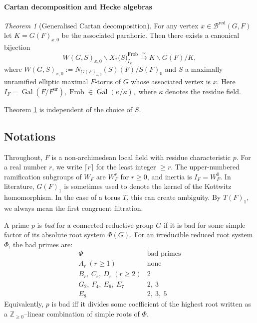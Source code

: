 \documentclass[american]{article}
\numberwithin{equation}{section}
\numberwithin{figure}{section}
\theoremstyle{plain}
\theoremstyle{definition}
\theoremstyle{remark}
\newcounter{thmA}
\newtheorem{theoremA}[thmA]{Theorem}
\DeclareMathOperator{\Gal}{Gal}
\DeclareMathOperator{\Frob}{Frob}
\begin{document}
\paragraph{Cartan decomposition and Hecke algebras}
\begin{theoremA}[Generalised Cartan decomposition]\label{thm:D}
For any vertex $x\in\mathcal{B}^{\mathrm{red}}(G,F)$ let $K=G(F)_{x,0}$ be the associated parahoric. Then there exists a canonical bijection
\[
  W(G,S)_{x,0}\backslash X_{*}\!\bigl(S\bigr)_{I_F}^{\Frob} \xrightarrow{\;\sim\;} K\backslash G(F)/K,
\]
where $W(G,S)_{x,0}:=N_{G(F)_{x,0}}(S)(F)/S(F)_0$ and \(S\) a maximally unramified elliptic maximal \(F\)-torus of \(G\) whose associated vertex is \(x\). Here \(I_{F}=\Gal(\overline{F}/F^{\mathrm{ur}}), \Frob\in\Gal(\overline{\kappa}/\kappa), \) where \(\kappa\) denotes the residue field. 

\end{theoremA}
Theorem \ref{thm:D} is independent of the choice of \(S\).
\smallskip
\renewcommand{\thetheoremA}{A}


\subsection*{Notations}
Throughout, $F$ is a non-archimedean local field with residue characteristic $p$. For a real number $r$, we write $\lceil r\rceil$ for the least integer $\ge r$. The upper-numbered ramification subgroups of $W_F$ are $W_F^{r}$ for $r\ge0$, and inertia is $I_F=W_F^0$.
In literature, \(G(F)_1\) is sometimes used to denote the kernel of the Kottwitz homomorphism. In the case of a torus \(T\), this can create ambiguity. By \(T(F)_1\), we always mean the first congruent filtration. 


A prime $p$ is \emph{bad} for a connected reductive group $G$ if it is bad for some simple factor
of its absolute root system $\Phi(G)$. For an irreducible reduced root system $\Phi$, the bad
primes are:
\[
\begin{array}{c|l}
\Phi & \text{bad primes} \\ \hline
A_r\ (r\ge 1) & \text{none} \\
B_r,\ C_r,\ D_r\ (r\ge 2) & 2 \\
G_2,\ F_4,\ E_6,\ E_7 & 2,\ 3 \\
E_8 & 2,\ 3,\ 5
\end{array}
\]
Equivalently, $p$ is bad iff it divides some coefficient of the highest root written as a
$\mathbb{Z}_{\ge0}$--linear combination of simple roots of $\Phi$.
\end{document}
